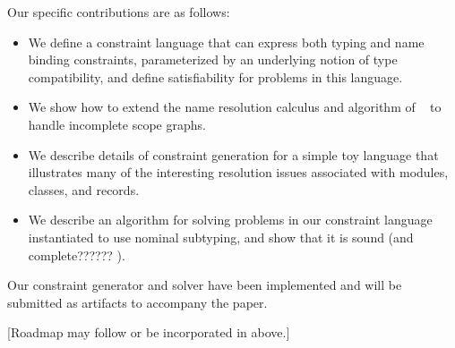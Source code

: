 Our specific contributions are as follows:

\begin{itemize}
\item We define a constraint language that can express both typing 
and name binding constraints, parameterized by an underlying notion
of type compatibility, and define satisfiability for problems
in this language. 
\item We show how to extend the name resolution calculus and algorithm of 
~\cite{NeronTVW-ESOP-2015} to handle incomplete scope graphs.
\item We describe details of constraint generation for a simple toy
language that illustrates many of the interesting resolution issues
associated with modules, classes, and records. 
\item We describe an algorithm for solving problems in our constraint
language instantiated to use nominal subtyping, and show that it is 
sound (and complete?????? ).
\end{itemize}
Our constraint generator and solver have been implemented and will
be submitted as artifacts to accompany the paper.

[Roadmap may follow or be incorporated in above.]







